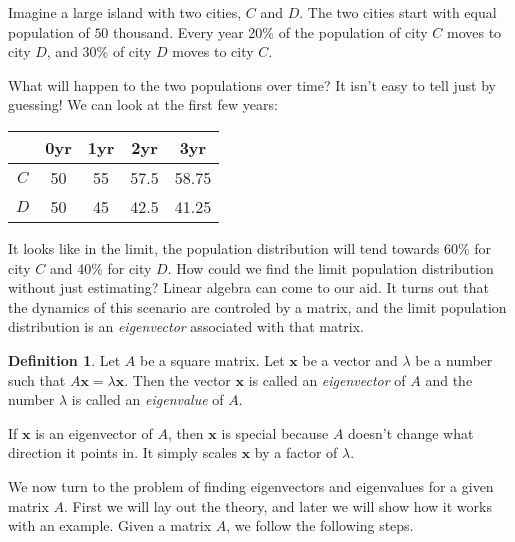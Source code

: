 \documentclass[11pt,oneside]{amsbook}
\theoremstyle{definition}
\theoremstyle{plain}
\theoremstyle{definition}
\newtheorem{definition}[theorem]{Definition}
\theoremstyle{remark}
\numberwithin{equation}{section}
\numberwithin{figure}{section}
\begin{document}
Imagine a large island with two cities, $C$ and $D$. The two cities start with equal population of $50$ thousand. Every year 20\% of the population of city $C$ moves to city $D$, and 30\% of city $D$ moves to city $C$.
\begin{center}
\end{center}
What will happen to the two populations over time? It isn't easy to tell just by guessing! We can look at the first few years:
\begin{center}
  \begin{tabular}{ccccc}
     & 0yr & 1yr & 2yr & 3yr \\\hline
    $C$ & 50 & 55 & 57.5 & 58.75 \\
    $D$ & 50 & 45 & 42.5 & 41.25
  \end{tabular}
\end{center}
It looks like in the limit, the population distribution will tend towards 60\% for city $C$ and 40\% for city $D$. How could we find the limit population distribution without just estimating? Linear algebra can come to our aid. It turns out that the dynamics of this scenario are controled by a matrix, and the limit population distribution is an \emph{eigenvector} associated with that matrix.

\begin{definition}
  Let $A$ be a square matrix. Let $\mathbf{x}$ be a vector and $\lambda$ be a number such that $A\mathbf{x}=\lambda\mathbf{x}$. Then the vector $\mathbf x$ is called an \emph{eigenvector} of $A$ and the number $\lambda$ is called an \emph{eigenvalue} of $A$.
\end{definition}

If $\mathbf{x}$ is an eigenvector of $A$, then $\mathbf{x}$ is special because $A$ doesn't change what direction it points in. It simply scales $\mathbf{x}$ by a factor of $\lambda$.

We now turn to the problem of finding eigenvectors and eigenvalues for a given matrix $A$. First we will lay out the theory, and later we will show how it works with an example. Given a matrix $A$, we follow the following steps.
\end{document}
